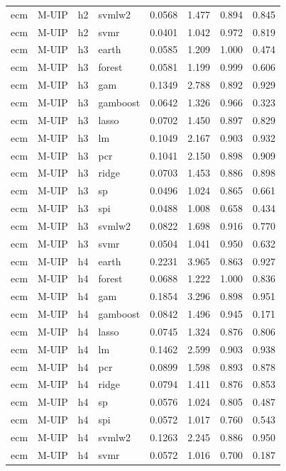 \begin{ThreePartTable}
\begin{longtable}[t]{llclcccc}
ecm & M-UIP & h2 & svmlw2 & 0.0568 & 1.477 & 0.894 & 0.845\\
ecm & M-UIP & h2 & svmr & 0.0401 & 1.042 & 0.972 & 0.819\\
\addlinespace
ecm & M-UIP & h3 & earth & 0.0585 & 1.209 & 1.000 & 0.474\\
ecm & M-UIP & h3 & forest & 0.0581 & 1.199 & 0.999 & 0.606\\
ecm & M-UIP & h3 & gam & 0.1349 & 2.788 & 0.892 & 0.929\\
ecm & M-UIP & h3 & gamboost & 0.0642 & 1.326 & 0.966 & 0.323\\
ecm & M-UIP & h3 & lasso & 0.0702 & 1.450 & 0.897 & 0.829\\
ecm & M-UIP & h3 & lm & 0.1049 & 2.167 & 0.903 & 0.932\\
ecm & M-UIP & h3 & pcr & 0.1041 & 2.150 & 0.898 & 0.909\\
ecm & M-UIP & h3 & ridge & 0.0703 & 1.453 & 0.886 & 0.898\\
ecm & M-UIP & h3 & sp & 0.0496 & 1.024 & 0.865 & 0.661\\
ecm & M-UIP & h3 & spi & 0.0488 & 1.008 & 0.658 & 0.434\\
ecm & M-UIP & h3 & svmlw2 & 0.0822 & 1.698 & 0.916 & 0.770\\
ecm & M-UIP & h3 & svmr & 0.0504 & 1.041 & 0.950 & 0.632\\
\addlinespace
ecm & M-UIP & h4 & earth & 0.2231 & 3.965 & 0.863 & 0.927\\
ecm & M-UIP & h4 & forest & 0.0688 & 1.222 & 1.000 & 0.836\\
ecm & M-UIP & h4 & gam & 0.1854 & 3.296 & 0.898 & 0.951\\
ecm & M-UIP & h4 & gamboost & 0.0842 & 1.496 & 0.945 & 0.171\\
ecm & M-UIP & h4 & lasso & 0.0745 & 1.324 & 0.876 & 0.806\\
ecm & M-UIP & h4 & lm & 0.1462 & 2.599 & 0.903 & 0.938\\
ecm & M-UIP & h4 & pcr & 0.0899 & 1.598 & 0.893 & 0.878\\
ecm & M-UIP & h4 & ridge & 0.0794 & 1.411 & 0.876 & 0.853\\
ecm & M-UIP & h4 & sp & 0.0576 & 1.024 & 0.805 & 0.487\\
ecm & M-UIP & h4 & spi & 0.0572 & 1.017 & 0.760 & 0.543\\
ecm & M-UIP & h4 & svmlw2 & 0.1263 & 2.245 & 0.886 & 0.950\\
ecm & M-UIP & h4 & svmr & 0.0572 & 1.016 & 0.700 & 0.187\\

\end{longtable}
\end{ThreePartTable}
